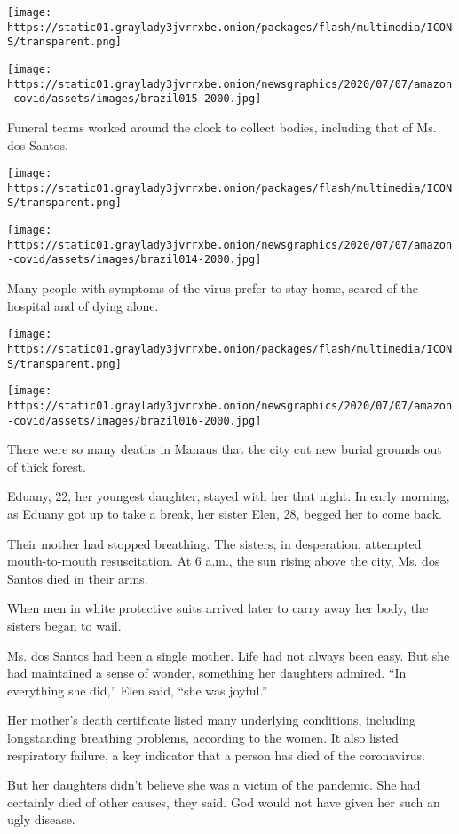 \texttt{[image: https://static01.graylady3jvrrxbe.onion/packages/flash/multimedia/ICONS/transparent.png]}

\texttt{[image: https://static01.graylady3jvrrxbe.onion/newsgraphics/2020/07/07/amazon-covid/assets/images/brazil015-2000.jpg]}

Funeral teams worked around the clock to collect bodies, including that
of Ms. dos Santos.

\texttt{[image: https://static01.graylady3jvrrxbe.onion/packages/flash/multimedia/ICONS/transparent.png]}

\texttt{[image: https://static01.graylady3jvrrxbe.onion/newsgraphics/2020/07/07/amazon-covid/assets/images/brazil014-2000.jpg]}

Many people with symptoms of the virus prefer to stay home, scared of
the hospital and of dying alone.

\texttt{[image: https://static01.graylady3jvrrxbe.onion/packages/flash/multimedia/ICONS/transparent.png]}

\texttt{[image: https://static01.graylady3jvrrxbe.onion/newsgraphics/2020/07/07/amazon-covid/assets/images/brazil016-2000.jpg]}

There were so many deaths in Manaus that the city cut new burial grounds
out of thick forest.

Eduany, 22, her youngest daughter, stayed with her that night. In early
morning, as Eduany got up to take a break, her sister Elen, 28, begged
her to come back.

Their mother had stopped breathing. The sisters, in desperation,
attempted mouth-to-mouth resuscitation. At 6 a.m., the sun rising above
the city, Ms. dos Santos died in their arms.

When men in white protective suits arrived later to carry away her body,
the sisters began to wail.

Ms. dos Santos had been a single mother. Life had not always been easy.
But she had maintained a sense of wonder, something her daughters
admired. ``In everything she did,'' Elen said, ``she was joyful.''

Her mother's death certificate listed many underlying conditions,
including longstanding breathing problems, according to the women. It
also listed respiratory failure, a key indicator that a person has died
of the coronavirus.

But her daughters didn't believe she was a victim of the pandemic. She
had certainly died of other causes, they said. God would not have given
her such an ugly disease.

